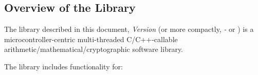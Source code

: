 \chapter[\ciovzerotitleemph{}]{\ciovzerolongtitleemph{}}
\chaptermark{\ciovzeroshorttitlenoemph{}}
\label{ciov0}

\section{Overview of the Library}
\label{ciov0:sdpr0}

The library described in this document,
\emph{\productbasenameshort{} Version \productversion{}} (or more compactly,
\emph{\productbasenameshort{}-\productversion{}} or
\emph{\productbasenameshort{}}) is a microcontroller-centric
multi-threaded C/C++-callable 
arith\-me\-tic/\-math\-e\-mat\-i\-cal/\-cryp\-to\-graph\-ic 
software library.

The library includes functionality for: 

